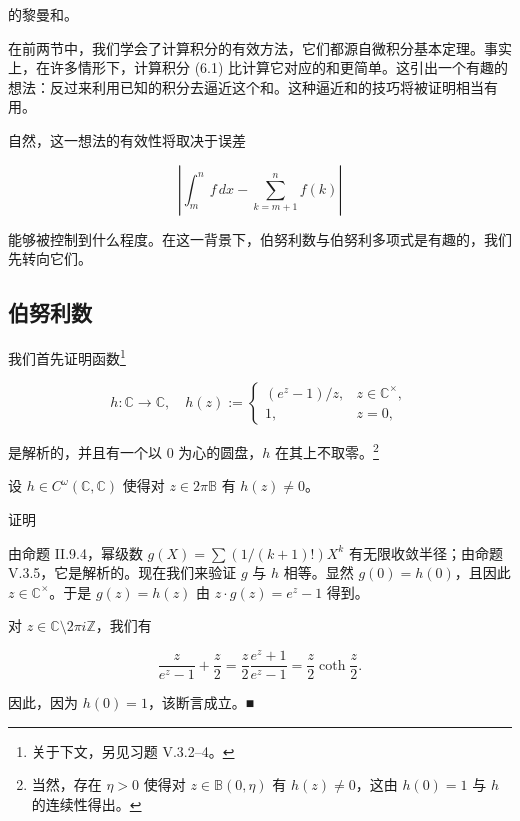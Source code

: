 的黎曼和。

在前两节中，我们学会了计算积分的有效方法，它们都源自微积分基本定理。事实上，在许多情形下，计算积分 (6.1) 比计算它对应的和更简单。这引出一个有趣的想法：反过来利用已知的积分去逼近这个和。这种逼近和的技巧将被证明相当有用。

自然，这一想法的有效性将取决于误差

\begin{equation}
\left| \int_{m}^{n} f \, dx - \sum_{k=m+1}^{n} f(k) \right|\tag{6.2}
\end{equation}

能够被控制到什么程度。在这一背景下，伯努利数与伯努利多项式是有趣的，我们先转向它们。

\subsection*{伯努利数}

我们首先证明函数\footnote{关于下文，另见习题 V.3.2–4。}

\begin{equation*}
h : \mathbb{C} \to \mathbb{C} , \quad h(z) := \begin{cases} (e^z - 1)/z , & z \in \mathbb{C}^\times , \\ 1 , & z = 0 , \end{cases}
\end{equation*}

是解析的，并且有一个以 0 为心的圆盘，$ h $ 在其上不取零。\footnote{当然，存在 $ \eta > 0 $ 使得对 $ z \in \mathbb{B}(0, \eta) $ 有 $ h(z) \ne 0 $，这由 $ h(0) = 1 $ 与 $ h $ 的连续性得出。}

\begin{lemma}

设 $ h \in C^{\omega}(\mathbb{C}, \mathbb{C}) $ 使得对 $ z \in 2\pi\mathbb{B} $ 有 $ h(z) \ne 0 $。

证明

\begin{subitems}
\item

由命题 II.9.4，幂级数 $ g(X) = \sum (1/(k+1)!)X^k $ 有无限收敛半径；由命题 V.3.5，它是解析的。现在我们来验证 $ g $ 与 $ h $ 相等。显然 $ g(0) = h(0) $，且因此 $ z \in \mathbb{C}^\times $。于是 $ g(z) = h(z) $ 由 $ z \cdot g(z) = e^z - 1 $ 得到。

\item

对 $ z \in \mathbb{C} \setminus 2\pi i\mathbb{Z} $，我们有

\begin{equation}
\frac{z}{e^z - 1} + \frac{z}{2} = \frac{z}{2}\frac{e^z + 1}{e^z - 1} = \frac{z}{2}\coth\frac{z}{2} .\tag{6.3}
\end{equation}

因此，因为 $ h(0) = 1 $，该断言成立。\nobreak\hspace{0.35em}■

\end{subitems}

\end{lemma}

